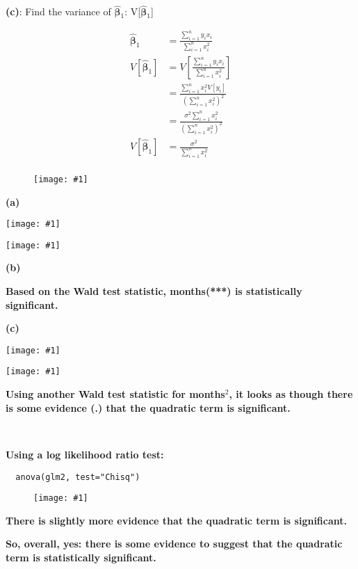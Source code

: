 \documentclass{article}
\newcommand{\mt}[1]{\ensuremath{#1}}
\newcommand{\bpth}[1]{\textbf{(#1)}}
\newcommand{\uw}[2]{#1\mt{_{#2}}}
\newcommand{\uf}[2]{#1\mt{^{#2}}}
\newcommand{\eqn}[1]{\[#1\]}
\newcommand{\splt}[1]{\begin{split}#1\end{split}}
\newcommand{\ssq}{\mt{\sigma^2}}
\newcommand{\bh}[1]{\mathbf{\hat{\text{$#1$}}}}
\newcommand{\bth}{\mt{\bh{\beta}}}
\newcommand{\vrn}[1]{V[#1]}
\newcommand{\img}[1]{
\begin{figure}[h]
  \texttt{[image: \#1]}
\end{figure}
}
\newcommand{\simg}[1]{
  \texttt{[image: \#1]}
}
\newcommand{\wimg}[1]{
\begin{figure}[h]
  \texttt{[image: \#1]}
\end{figure}
}
\newcommand{\sumin}[1]{\mt{\sum_{i = 1}^n #1}}
\begin{document}
\bpth{c}: Find the variance of \uw{\bth}{1}: V[\uw{\bth}{1}]

\eqn{
	\splt{\bth_1 & = \frac{\sumin{y_ix_i}}{\sumin{x_i^2}} \\
	\vrn{\bth_1} & = \vrn{\frac{\sumin{y_ix_i}}{\sumin{x_i^2}}} \\
	& = \frac{\sumin{x_i^2\vrn{y_i}}}{(\sumin{x_i^2})^2} \\
	& = \frac{\ssq\sumin{x_i^2}}{(\sumin{x_i^2})^2} \\
	\vrn{\bth_1} & = \frac{\ssq}{\sumin{x_i^2}} \\}
}

\newpage

\wimg{THFP2}

\bpth{a}

\simg{FQ2Sum}
\simg{FQ2Anov}

\bpth{b}

\textbf{Based on the Wald test statistic, months(***) is statistically significant.}

\newpage

\bpth{c}

\simg{FQ2Sum2}
\simg{FQ2Anov}

\textbf{Using another Wald test statistic for \uf{months}{2}, it looks as though there is some evidence (.) that the quadratic term is significant.}

\

\textbf{Using a log likelihood ratio test:}

\begin{verbatim}
  anova(glm2, test="Chisq")
\end{verbatim}

\img{FQ2Lik}

\textbf{There is slightly more evidence that the quadratic term is significant.}

\textbf{So, overall, yes: there is some evidence to suggest that the quadratic term is statistically significant.}
\end{document}
